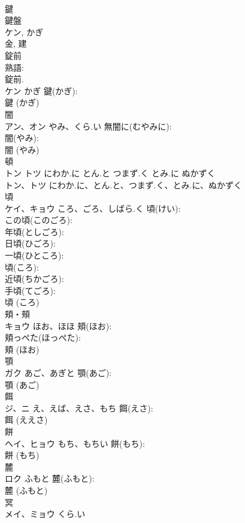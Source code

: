 \documentclass[8pt]{extreport}
\begin{document}
\begin{CJK}{UTF8}{min}
\\	鍵			
\\	鍵盤
\\	ケン, かぎ 
\\	金, 建 
\\	錠前 
\\	熟語: 
\\	錠前.	
\\	ケン	かぎ	鍵(かぎ): 
\\	鍵 (かぎ)
\\	闇			
\\	アン、オン	やみ、くら.い	無闇に(むやみに): 
\\	闇(やみ): 
\\	闇 (やみ)
\\	頓			
\\	トン トツ にわか.に とん.と つまず.く とみ.に ぬかずく 
\\	トン、トツ	にわか.に、とん.と、つまず.く、とみ.に、ぬかずく		
\\	頃			
\\	ケイ、キョウ	ころ、ごろ、しばら.く	頃(けい): 
\\	この頃(このごろ): 
\\	年頃(としごろ): 
\\	日頃(ひごろ): 
\\	一頃(ひところ): 
\\	頃(ころ): 
\\	近頃(ちかごろ): 
\\	手頃(てごろ): 
\\	頃 (ころ)
\\	頬・頰			
\\	キョウ	ほお、ほほ	頬(ほお): 
\\	頬っぺた(ほっぺた): 
\\	頬 (ほお)
\\	顎			
\\	ガク	あご、あぎと	顎(あご): 
\\	顎 (あご)
\\	餌			
\\	ジ、ニ	え、えば、えさ、もち	餌(えさ): 
\\	餌 (ええさ)
\\	餅			
\\	ヘイ、ヒョウ	もち、もちい	餅(もち): 
\\	餅 (もち)
\\	麓			
\\	ロク	ふもと	麓(ふもと): 
\\	麓 (ふもと)
\\	冥			
\\	メイ、ミョウ	くら.い		

\end{CJK}
\end{document}
